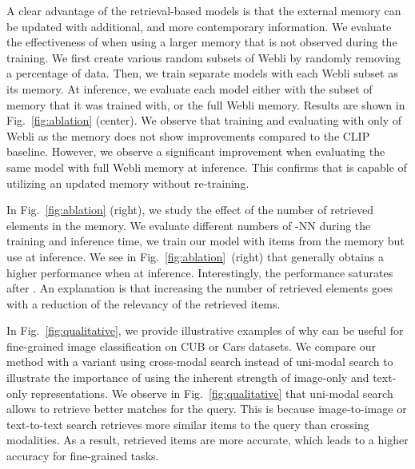 A clear advantage of the retrieval-based models is that the external memory can be updated with additional, and more contemporary information.
We evaluate the effectiveness of \OURS when using a larger memory that is not observed during the training.
We first create various random subsets of Webli by randomly removing a percentage of data.
Then, we train separate \OURS models with each Webli subset as its memory.
At inference, we evaluate each \OURS model either with the subset of memory that it was trained with, or the full Webli memory.
Results are shown in Fig.~\ref{fig:ablation} (center).
We observe that training and evaluating \OURS with only  of Webli as the memory does not show improvements compared to the CLIP baseline.
However, we observe a significant improvement when evaluating the same model with full Webli memory at inference.
This confirms that \OURS is capable of utilizing an updated memory without re-training.


In Fig.~\ref{fig:ablation} (right), we study the effect of the number of retrieved elements in the memory.
We evaluate different numbers of -NN during the training and inference time, \ie we train our model with  items from the memory but use  at inference.
We see in Fig.~\ref{fig:ablation}~(right) that \OURS generally obtains a higher performance when  at inference.
Interestingly, the performance saturates after .
An explanation is that increasing the number of retrieved elements goes with a reduction of the relevancy of the retrieved items.


In Fig.~\ref{fig:qualitative}, we provide illustrative examples of why \OURS can be useful for fine-grained image classification on CUB or Cars datasets.
We compare our method with a variant using cross-modal search instead of uni-modal search to illustrate the importance of using the inherent strength of image-only and text-only representations.
We observe in Fig.~\ref{fig:qualitative} that uni-modal search allows to retrieve better matches for the query.
This is because image-to-image or text-to-text search retrieves more similar items to the query than crossing modalities.
As a result, retrieved items are more accurate, which leads to a higher accuracy for fine-grained tasks.


